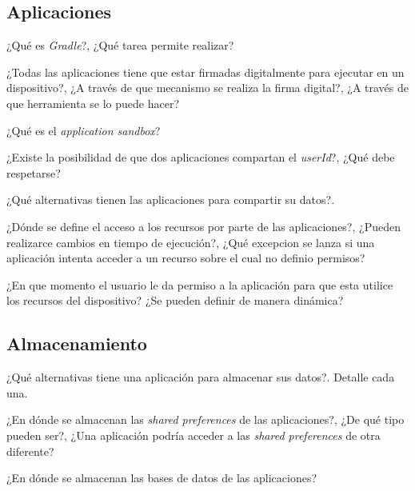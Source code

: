 \subsection{Aplicaciones}
\begin{questions}
  \question ¿Qué es \textit{Gradle}?, ¿Qué tarea permite realizar?
  
  \question ¿Todas las aplicaciones tiene que estar firmadas digitalmente para ejecutar en un dispositivo?, ¿A través de que mecanismo se realiza la firma digital?, ¿A través de que herramienta se lo puede hacer?
  
  \question ¿Qué es el \textit{application sandbox}?
  
  \question ¿Existe la posibilidad de que dos aplicaciones compartan el \textit{userId}?, ¿Qué debe respetarse?
  
  \question ¿Qué alternativas tienen las aplicaciones para compartir su datos?.
  
  \question ¿Dónde se define el acceso a los recursos por parte de las aplicaciones?, ¿Pueden realizarce cambios en tiempo de ejecución?, ¿Qué excepcion se lanza si una aplicación intenta acceder a un recurso sobre el cual no definio permisos?
  
  \question ¿En que momento el usuario le da permiso a la aplicación para que esta utilice los recursos del dispositivo? ¿Se pueden definir de manera dinámica?
\end{questions}

\subsection{Almacenamiento}
\begin{questions}
  \question ¿Qué alternativas tiene una aplicación para almacenar sus datos?. Detalle cada una.

  \question ¿En dónde se almacenan las \textit{shared preferences} de las aplicaciones?, ¿De qué tipo pueden ser?, ¿Una aplicación podría acceder a las \textit{shared preferences} de otra diferente?
  
  \question ¿En dónde se almacenan las bases de datos de las aplicaciones?
\end{questions}

